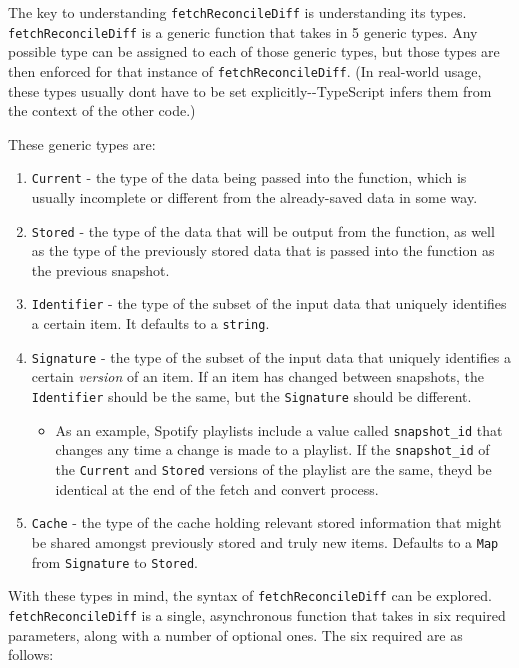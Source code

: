 \documentclass[manuscript,review,anonymous]{acmart}
\begin{document}
The key to understanding \texttt{fetchReconcileDiff} is understanding
its types. \texttt{fetchReconcileDiff} is a generic function that takes
in 5 generic types. Any possible type can be assigned to each of those
generic types, but those types are then enforced for that instance of
\texttt{fetchReconcileDiff}. (In real-world usage, these types usually
don\textquotesingle t have to be set explicitly-\/-TypeScript infers
them from the context of the other code.)

These generic types are:

\begin{enumerate}
\tightlist
\item
  \texttt{Current} - the type of the data being passed into the
  function, which is usually incomplete or different from the
  already-saved data in some way.
\item
  \texttt{Stored} - the type of the data that will be output from the
  function, as well as the type of the previously stored data that is
  passed into the function as the previous snapshot.
\item
  \texttt{Identifier} - the type of the subset of the input data that
  uniquely identifies a certain item. It defaults to a \texttt{string}.
\item
  \texttt{Signature} - the type of the subset of the input data that
  uniquely identifies a certain \emph{version} of an item. If an item
  has changed between snapshots, the \texttt{Identifier} should be the
  same, but the \texttt{Signature} should be different.

  \begin{itemize}
  \tightlist
  \item
    As an example, Spotify playlists include a value called
    \texttt{snapshot\_id} that changes any time a change is made to a
    playlist. If the \texttt{snapshot\_id} of the \texttt{Current} and
    \texttt{Stored} versions of the playlist are the same,
    they\textquotesingle d be identical at the end of the fetch and
    convert process.
  \end{itemize}
\item
  \texttt{Cache} - the type of the cache holding relevant stored
  information that might be shared amongst previously stored and truly
  new items. Defaults to a \texttt{Map} from \texttt{Signature} to
  \texttt{Stored}.
\end{enumerate}

With these types in mind, the syntax of \texttt{fetchReconcileDiff} can
be explored. \texttt{fetchReconcileDiff} is a single, asynchronous
function that takes in six required parameters, along with a number of
optional ones. The six required are as follows:
\end{document}
